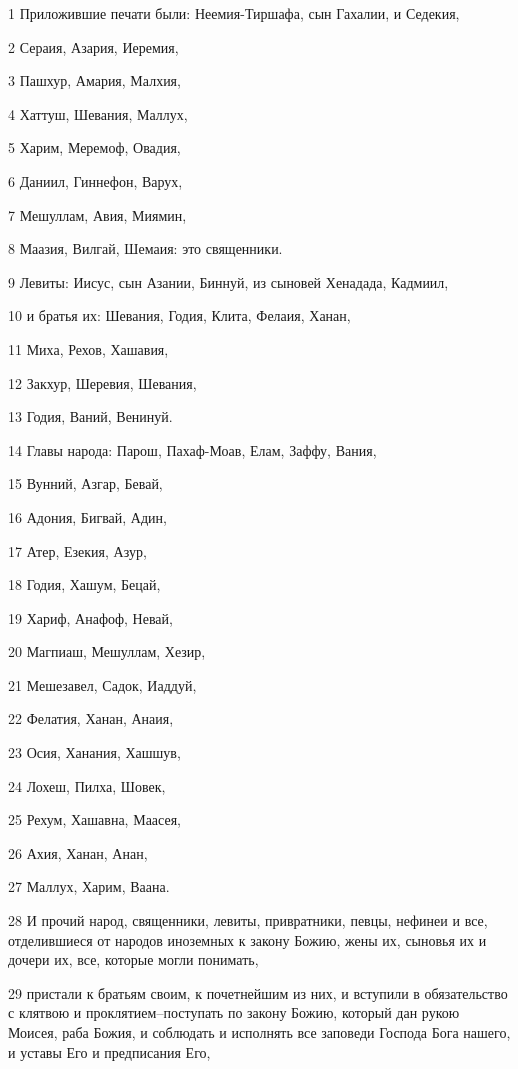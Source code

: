 \par 1 Приложившие печати были: Неемия-Тиршафа, сын Гахалии, и Седекия,
\par 2 Сераия, Азария, Иеремия,
\par 3 Пашхур, Амария, Малхия,
\par 4 Хаттуш, Шевания, Маллух,
\par 5 Харим, Меремоф, Овадия,
\par 6 Даниил, Гиннефон, Варух,
\par 7 Мешуллам, Авия, Миямин,
\par 8 Маазия, Вилгай, Шемаия: это священники.
\par 9 Левиты: Иисус, сын Азании, Биннуй, из сыновей Хенадада, Кадмиил,
\par 10 и братья их: Шевания, Годия, Клита, Фелаия, Ханан,
\par 11 Миха, Рехов, Хашавия,
\par 12 Закхур, Шеревия, Шевания,
\par 13 Годия, Ваний, Венинуй.
\par 14 Главы народа: Парош, Пахаф-Моав, Елам, Заффу, Вания,
\par 15 Вунний, Азгар, Бевай,
\par 16 Адония, Бигвай, Адин,
\par 17 Атер, Езекия, Азур,
\par 18 Годия, Хашум, Бецай,
\par 19 Хариф, Анафоф, Невай,
\par 20 Магпиаш, Мешуллам, Хезир,
\par 21 Мешезавел, Садок, Иаддуй,
\par 22 Фелатия, Ханан, Анаия,
\par 23 Осия, Ханания, Хашшув,
\par 24 Лохеш, Пилха, Шовек,
\par 25 Рехум, Хашавна, Маасея,
\par 26 Ахия, Ханан, Анан,
\par 27 Маллух, Харим, Ваана.
\par 28 И прочий народ, священники, левиты, привратники, певцы, нефинеи и все, отделившиеся от народов иноземных к закону Божию, жены их, сыновья их и дочери их, все, которые могли понимать,
\par 29 пристали к братьям своим, к почетнейшим из них, и вступили в обязательство с клятвою и проклятием--поступать по закону Божию, который дан рукою Моисея, раба Божия, и соблюдать и исполнять все заповеди Господа Бога нашего, и уставы Его и предписания Его,
